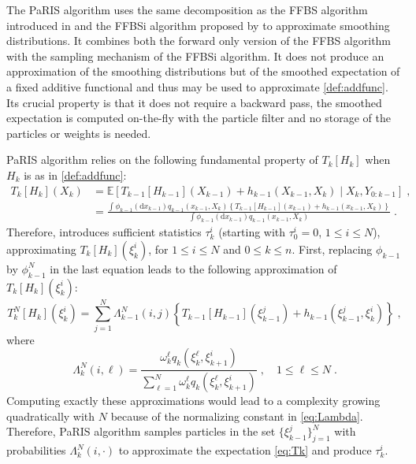 \documentclass[12pt]{article}
\newcommand{\rmd}{\mathrm{d}}
\newcommand{\eqsp}{\;}
\newcommand{\1}{\mathrm{1}}
\newcommand{\qk}{q_{k}}
\begin{document}
The PaRIS algorithm uses the same decomposition as the FFBS algorithm introduced in \cite{doucetgodsillandrieu:2000} and the FFBSi algorithm proposed by \cite{godsill:doucet:west:2004} to approximate smoothing distributions.
 It combines both the forward only version of the FFBS algorithm with the sampling mechanism of the FFBSi algorithm.
  It does not produce an approximation of the smoothing distributions but of the smoothed expectation of a fixed additive functional and thus  may be used to approximate \eqref{def:addfunc}.
   Its crucial property is that it does not require a backward pass, the smoothed expectation is computed on-the-fly with the particle filter and no storage of the particles or weights is needed. 

PaRIS algorithm relies on the following fundamental property of $T_k[H_k]$ when $H_k$ is as in \eqref{def:addfunc}:
\begin{align*}
T_k[H_k](X_k) &=\mathbb{E}\left[T_{k-1}[H_{k-1}](X_{k-1}) + h_{k-1}(X_{k-1},X_k)\middle|X_k,Y_{0:k-1} \right]\eqsp,\\
&= \frac{\int \phi_{k-1}(\rmd x_{k-1})q_{k-1}(x_{k-1},X_k)\left\{T_{k-1}[H_{k-1}](x_{k-1}) + h_{k-1}(x_{k-1},X_k)\right\}}{\int \phi_{k-1}(\rmd x_{k-1})q_{k-1}(x_{k-1},X_k)}\eqsp.
\end{align*}
Therefore, \cite{olsson:westerborn:2016} introduces sufficient statistics $\tau^i_k$ (starting with $\tau^i_0 = 0$, $1\le i\le N$), approximating $T_k[H_k](\xi^i_k)$, for $1\le i\le N$ and $0\le k \le n$. First, replacing $\phi_{k-1}$ by $\phi^N_{k-1}$ in the last equation leads to the following approximation of $T_k[H_k](\xi^i_k)$:
\begin{equation}
\label{eq:Tk}
T_k^N[H_k](\xi_k^i) = \sum_{j=1}^N \Lambda_{k-1}^N(i,j)\left\{T_{k-1}[H_{k-1}](\xi_{k-1}^j) + h_{k-1}(\xi^j_{k-1},\xi^i_k)\right\}\eqsp, 
\end{equation}
where
\begin{equation}
\label{eq:Lambda}
\Lambda_{k}^N(i,\ell) = \frac{\omega^{\ell}_{k} \qk(\xi^{\ell}_{k},\xi_{k+1}^{i})}{\sum_{\ell=1}^N\omega^{\ell}_{k} \qk(\xi^{\ell}_{k},\xi_{k+1}^{i})}\eqsp,\quad 1\le \ell\le N\eqsp.
\end{equation}
Computing exactly these approximations would lead to a complexity growing quadratically with $N$ because of the normalizing constant in \eqref{eq:Lambda}.
 Therefore, PaRIS algorithm samples particles in the set $\{\xi^j_{k-1}\}_{j=1}^N$ with probabilities $\Lambda_{k}^N(i,\cdot)$ to approximate the expectation \eqref{eq:Tk} and produce $\tau^i_k$.
\end{document}
